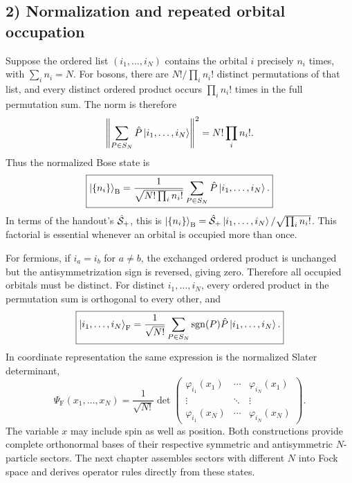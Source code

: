 \subsection*{2) Normalization and repeated orbital occupation}

Suppose the ordered list $(i_1,\ldots,i_N)$ contains the orbital $i$ precisely $n_i$ times, with $\sum_i n_i=N$. For bosons, there are $N!/\prod_i n_i!$ distinct permutations of that list, and every distinct ordered product occurs $\prod_i n_i!$ times in the full permutation sum. The norm is therefore
\begin{equation}
\left\|\sum_{P\in S_N}\hat{P}\left|i_1,\ldots,i_N\right\rangle\right\|^2
   =N!\prod_i n_i!.
\end{equation}
Thus the normalized Bose state is
\begin{equation}
\boxed{\left|\{n_i\}\right\rangle_{\mathrm B}
  =\frac1{\sqrt{N!\prod_i n_i!}}
    \sum_{P\in S_N}\hat{P}\left|i_1,\ldots,i_N\right\rangle.}
\end{equation}
In terms of the handout's $\hat{\mathcal S}_+$, this is $\left|\{n_i\}\right\rangle_{\mathrm B}
=\hat{\mathcal S}_+\left|i_1,\ldots,i_N\right\rangle/\sqrt{\prod_i n_i!}$. This factorial is essential whenever an orbital is occupied more than once.

For fermions, if $i_a=i_b$ for $a\ne b$, the exchanged ordered product is unchanged but the antisymmetrization sign is reversed, giving zero. Therefore all occupied orbitals must be distinct. For distinct $i_1,\ldots,i_N$, every ordered product in the permutation sum is orthogonal to every other, and
\begin{equation}
\boxed{\left|i_1,\ldots,i_N\right\rangle_{\mathrm F}
=\frac1{\sqrt{N!}}\sum_{P\in S_N}
     \operatorname{sgn}(P)\hat{P}\left|i_1,\ldots,i_N\right\rangle.}
\end{equation}
In coordinate representation the same expression is the normalized Slater determinant,
\begin{equation}
\Psi_{\mathrm F}(x_1,\ldots,x_N)
=\frac1{\sqrt{N!}}\det\!\begin{pmatrix}
\varphi_{i_1}(x_1)&\cdots&\varphi_{i_N}(x_1)\\
\vdots&\ddots&\vdots\\
\varphi_{i_1}(x_N)&\cdots&\varphi_{i_N}(x_N)
\end{pmatrix}.
\end{equation}
The variable $x$ may include spin as well as position. Both constructions provide complete orthonormal bases of their respective symmetric and antisymmetric $N$-particle sectors. The next chapter assembles sectors with different $N$ into Fock space and derives operator rules directly from these states.